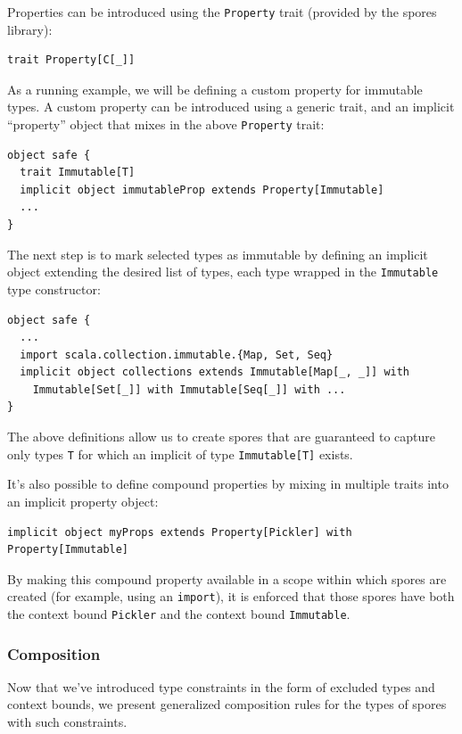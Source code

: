 \documentclass[runningheads]{llncs}
\begin{document}
\begin{sloppypar}
Properties can be introduced using the \verb|Property| trait (provided by the
spores library):

\begin{lstlisting}[numbers=none]
    trait Property[C[_]]
\end{lstlisting}
\noindent As a running example, we will be defining a custom  property for
immutable types. A custom property can be introduced using a generic trait,
and an implicit ``property'' object that mixes in the above \verb|Property|
trait:

\begin{lstlisting}
object safe {
  trait Immutable[T]
  implicit object immutableProp extends Property[Immutable]
  ...
}
\end{lstlisting}
\noindent
The next step is to mark selected types as immutable by defining an implicit object extending the desired list of types, each type wrapped in the \verb|Immutable| type constructor:

\begin{lstlisting}
object safe {
  ...
  import scala.collection.immutable.{Map, Set, Seq}
  implicit object collections extends Immutable[Map[_, _]] with
    Immutable[Set[_]] with Immutable[Seq[_]] with ...
}
\end{lstlisting}

\noindent
The above definitions allow us to create spores that are guaranteed to capture
only types \verb|T| for which an implicit of type \verb|Immutable[T]| exists.

It's also possible to define compound properties by mixing in multiple traits
into an implicit property object:

\begin{lstlisting}[numbers=none]
implicit object myProps extends Property[Pickler] with Property[Immutable]
\end{lstlisting}
\noindent By making this compound property available in a scope within which spores are
created (for example, using an \verb|import|), it is enforced that those
spores have both the context bound \verb|Pickler| and the context bound
\verb|Immutable|.


\subsubsection{Composition}

Now that we've introduced type constraints in the form of excluded types and
context bounds, we present generalized composition rules for the types of
spores with such constraints.


\end{sloppypar}
\end{document}
